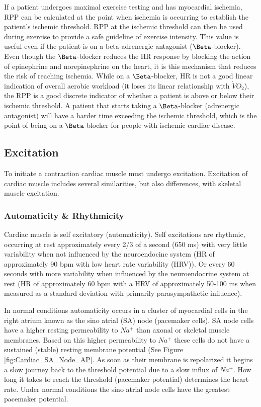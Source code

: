 If a patient undergoes maximal exercise testing and has myocardial ischemia, RPP can be calculated at the point when ischemia is occurring to establish the patient’s ischemic threshold. RPP at the ischemic threshold can then be used during exercise to provide a safe guideline of exercise intensity. This value is useful even if the patient is on a beta-adrenergic antagonist ($\Beta$-blocker). Even though the $\Beta$-blocker reduces the HR response by blocking the action of epinephrine and norepinephrine on the heart, it is this mechanism that reduces the risk of reaching ischemia. While on a $\Beta$-blocker, HR is not a good linear indication of overall aerobic workload (it loses its linear relationship with $\dot{V}O_2$), the RPP is a good discrete indicator of whether a patient is above or below their ischemic threshold. A patient that starts taking a $\Beta$-blocker (adrenergic antagonist) will have a harder time exceeding the ischemic threshold, which is the point of being on a $\Beta$-blocker for people with ischemic cardiac disease. 

\subsection{Excitation}

To initiate a contraction cardiac muscle must undergo excitation. Excitation of cardiac muscle includes several similarities, but also differences, with skeletal muscle excitation. 

\subsubsection{Automaticity \& Rhythmicity}

Cardiac muscle is self excitatory (automaticity). Self excitations are rhythmic, occurring at rest approximately every 2/3 of a second (650 ms) with very little variability when not influenced by the neuroendocine system (HR of approximately 90 bpm with low heart rate variability (HRV)). Or every 60 seconds with more variability when influenced by the neuroendocrine system at rest (HR of approximately 60 bpm with a HRV of approximately 50-100 ms when measured as a standard deviation with primarily parasympathetic influence).

In normal conditions automaticity occurs in a cluster of myocardial cells in the right atrium known as the sino atrial (SA) node (pacemaker cells). SA node cells have a higher resting permeability to $Na^+$ than axonal or skeletal muscle membranes. Based on this higher permeability to $Na^+$ these cells do not have a sustained (stable) resting membrane potential (See Figure \ref{fig:Cardiac_SA_Node_AP}. As soon as their membrane is repolarized it begins a slow journey back to the threshold potential due to a slow influx of $Na^+$. How long it takes to reach the threshold (pacemaker potential) determines the heart rate. Under normal conditions the sino atrial node cells have the greatest pacemaker potential.

